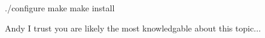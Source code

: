 ./configure
make
make install

Andy I trust you are likely the most knowledgable about this topic...
